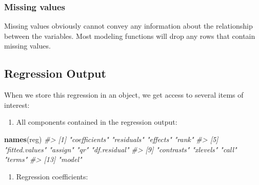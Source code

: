 \documentclass[
]{book}
\newenvironment{Shaded}{\begin{snugshade}}{\end{snugshade}}
\newcommand{\CommentTok}[1]{\textcolor[rgb]{0.56,0.35,0.01}{\textit{#1}}}
\newcommand{\KeywordTok}[1]{\textcolor[rgb]{0.13,0.29,0.53}{\textbf{#1}}}
\newcommand{\NormalTok}[1]{#1}
\newcommand{\OperatorTok}[1]{\textcolor[rgb]{0.81,0.36,0.00}{\textbf{#1}}}
\providecommand{\tightlist}{%
  \setlength{\itemsep}{0pt}\setlength{\parskip}{0pt}}
\begin{document}
\hypertarget{missing-values}{%
\subsubsection*{Missing values}\label{missing-values}}

Missing values obviously cannot convey any information about the relationship between the variables. Most modeling functions will drop any rows that contain missing values.

\hypertarget{regression-output}{%
\subsection{Regression Output}\label{regression-output}}

When we store this regression in an object, we get access to several items of interest:

\begin{enumerate}
\def\labelenumi{\arabic{enumi}.}
\tightlist
\item
  All components contained in the regression output:
\end{enumerate}

\begin{Shaded}
\begin{Highlighting}[]
\KeywordTok{names}\NormalTok{(reg)}
\CommentTok{#>  [1] "coefficients"  "residuals"     "effects"       "rank"         }
\CommentTok{#>  [5] "fitted.values" "assign"        "qr"            "df.residual"  }
\CommentTok{#>  [9] "contrasts"     "xlevels"       "call"          "terms"        }
\CommentTok{#> [13] "model"}
\end{Highlighting}
\end{Shaded}

\begin{enumerate}
\def\labelenumi{\arabic{enumi}.}
\setcounter{enumi}{1}
\tightlist
\item
  Regression coefficients:
\end{enumerate}

\begin{Shaded}
\end{Shaded}
\end{document}
